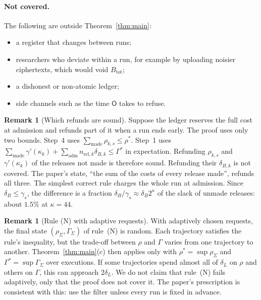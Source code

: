 \documentclass[11pt]{article}
\theoremstyle{definition}
\newtheorem{remark}[definition]{Remark}
\theoremstyle{plain}
\newcommand{\Op}{\mathsf{O}}
\newcommand{\Btot}{B_{\mathrm{tot}}}
\newcommand{\adm}{\mathrm{adm}}
\newcommand{\made}{\mathrm{made}}
\begin{document}
\paragraph{Not covered.} The following are outside Theorem~\ref{thm:main}:
\begin{itemize}[nosep]
  \item a register that changes between runs;
  \item researchers who deviate within a run, for example by uploading noisier ciphertexts, which would void $\Btot$;
  \item a dishonest or non-atomic ledger;
  \item side channels such as the time $\Op$ takes to refuse.
\end{itemize}

\begin{remark}[Which refunds are sound]\label{rem:refunds}
Suppose the ledger reserves the full cost at admission and refunds part of it when a run ends early. The proof uses only two bounds. Step~4 uses $\sum_{\made}\rho_{k,s}\le\rho^*$. Step~1 uses $\sum_{\made}\gamma'(\kappa_k)+\sum_{\adm}n_{\mathrm{rel},k}\delta_{B,k}\le\Gamma^*$ in expectation. Refunding $\rho_{k,s}$ and $\gamma'(\kappa_k)$ of the releases not made is therefore sound. Refunding their $\delta_{B,k}$ is not covered. The paper's state, ``the sum of the costs of every release made'', refunds all three. The simplest correct rule charges the whole run at admission. Since $\delta_B\le\gamma_s$, the difference is a fraction $\delta_B/\gamma_s\approx\delta_B2^{\kappa}$ of the slack of unmade releases: about $1.5\%$ at $\kappa=44$.
\end{remark}

\begin{remark}[Rule (N) with adaptive requests]\label{rem:Nadaptive}
With adaptively chosen requests, the final state $(\rho_\Sigma,\Gamma_\Sigma)$ of rule~(N) is random. Each trajectory satisfies the rule's inequality, but the trade-off between $\rho$ and $\Gamma$ varies from one trajectory to another. Theorem~\ref{thm:main}(c) then applies only with $\rho^*=\sup\rho_\Sigma$ and $\Gamma^*=\sup\Gamma_\Sigma$ over executions. If some trajectories spend almost all of $\delta_L$ on $\rho$ and others on $\Gamma$, this can approach $2\delta_L$. We do not claim that rule~(N) fails adaptively, only that the proof does not cover it. The paper's prescription is consistent with this: use the filter unless every run is fixed in advance.
\end{remark}
\end{document}
